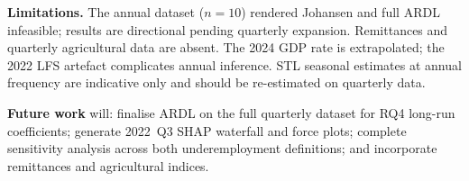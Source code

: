 \documentclass[sigconf]{acmart}
\begin{document}
\textbf{Limitations.} The annual dataset ($n{=}10$) rendered Johansen and full ARDL infeasible; results are directional pending quarterly expansion. Remittances and quarterly agricultural data are absent. The 2024 GDP rate is extrapolated; the 2022 LFS artefact complicates annual inference. STL seasonal estimates at annual frequency are indicative only and should be re-estimated on quarterly data.

\textbf{Future work} will: finalise ARDL on the full quarterly dataset for RQ4 long-run coefficients; generate 2022~Q3 SHAP waterfall and force plots; complete sensitivity analysis across both underemployment definitions; and incorporate remittances and agricultural indices.



\end{document}
